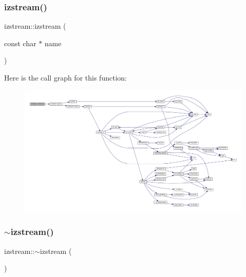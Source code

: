 \subsubsection{\texorpdfstring{izstream()}{izstream()}\hspace{0.1cm}{\footnotesize\ttfamily [3/3]}}
{\footnotesize\ttfamily izstream\+::izstream (\begin{DoxyParamCaption}\item[{const char $\ast$}]{name }\end{DoxyParamCaption})\hspace{0.3cm}{\ttfamily [inline]}}

Here is the call graph for this function\+:
\nopagebreak
\begin{figure}[H]
\begin{center}
\leavevmode
\includegraphics[width=350pt]{classizstream_a30fb60b38cda7232e23b199c00e72412_cgraph}
\end{center}
\end{figure}
\mbox{\label{classizstream_a55310a1de984e596df7b4236193ea1c3}} 
\subsubsection{\texorpdfstring{$\sim$izstream()}{~izstream()}}
{\footnotesize\ttfamily izstream\+::$\sim$izstream (\begin{DoxyParamCaption}{ }\end{DoxyParamCaption})\hspace{0.3cm}{\ttfamily [inline]}}

